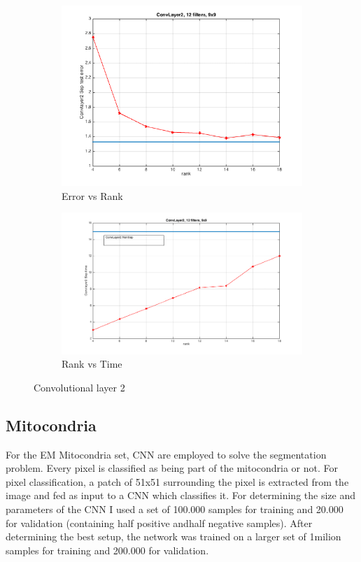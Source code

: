 \documentclass{article} %
\begin{document}
\begin{figure}[h]
  \centering
  \begin{subfigure}[b]{0.40\textwidth}
   \includegraphics[width=\textwidth]{presentation_plots/convL2_error.png}
    \caption{Error vs Rank}
  \end{subfigure}
  \begin{subfigure}[b]{0.40\textwidth}
    \includegraphics[width=\textwidth]{presentation_plots/convL2_time.png}
    \caption{Rank vs Time}
  \end{subfigure}
  \caption{Convolutional layer 2}
  \label{fig:cnn2error}
\end{figure}

\subsection{Mitocondria}
For the EM Mitocondria set, CNN are employed to solve the segmentation problem. Every pixel is classified as being part of the mitocondria or not.
For pixel classification, a patch of 51x51 surrounding the pixel is extracted from the image and fed as input to a CNN which classifies it.
For determining the size and parameters of the CNN I used a set of
100.000 samples for training and 20.000 for validation (containing half positive andhalf negative samples). After determining the best setup, the network was trained on a larger set of 1milion samples for training and 200.000 for validation.
\end{document}
